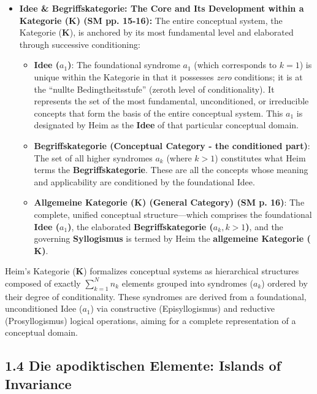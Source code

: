 \documentclass[12pt]{article}
\newcommand{\q}[1]{\enquote{#1}}
\newcommand{\kategorie}{\bm{K}}
\newcommand{\conceptualsyndrome}{a} %
\begin{document}
\begin{itemize}
    \item \textbf{Idee \& Begriffskategorie: The Core and Its Development within a Kategorie (\(\kategorie\)) (SM pp. 15-16):}
    The entire conceptual system, the Kategorie (\(\kategorie\)), is anchored by its most fundamental level and elaborated through successive conditioning:
    \begin{itemize}
        \item \textbf{Idee (\( \conceptualsyndrome_1 \))}: The foundational syndrome \( \conceptualsyndrome_1 \) (which corresponds to \( k=1 \)) is unique within the Kategorie in that it possesses \textit{zero} conditions; it is at the \q{nullte Bedingtheitsstufe} (zeroth level of conditionality). It represents the set of the most fundamental, unconditioned, or irreducible concepts that form the basis of the entire conceptual system. This \( \conceptualsyndrome_1 \) is designated by Heim as the \textbf{Idee} of that particular conceptual domain.
        \item \textbf{Begriffskategorie (Conceptual Category - the conditioned part)}: The set of all higher syndromes \( \conceptualsyndrome_k \) (where \( k > 1 \)) constitutes what Heim terms the \textbf{Begriffskategorie}. These are all the concepts whose meaning and applicability are conditioned by the foundational Idee.
        \item \textbf{Allgemeine Kategorie (\(\kategorie\)) (General Category) (SM p. 16)}: The complete, unified conceptual structure—which comprises the foundational \textbf{Idee (\( \conceptualsyndrome_1 \))}, the elaborated \textbf{Begriffskategorie (\( \conceptualsyndrome_k, k>1 \))}, and the governing \textbf{Syllogismus} is termed by Heim the \textbf{allgemeine Kategorie (\(\kategorie\))}. 
    \end{itemize}
\end{itemize}

Heim's Kategorie (\(\kategorie\)) formalizes conceptual systems as hierarchical structures composed of exactly $\sum_{k=1}^N n_k$ elements grouped into syndromes (\(\conceptualsyndrome_k\)) ordered by their degree of conditionality. These syndromes are derived from a foundational, unconditioned Idee (\(\conceptualsyndrome_1\)) via constructive (Episyllogismus) and reductive (Prosyllogismus) logical operations, aiming for a complete representation of a conceptual domain.

\subsection{1.4 Die apodiktischen Elemente: Islands of Invariance}
\label{sec:apodiktik}
\end{document}
